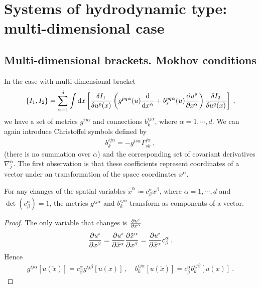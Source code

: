 \chapter{Systems of hydrodynamic type:  multi-dimensional case}

\section{Multi-dimensional brackets. Mokhov conditions}

In the case with multi-dimensional bracket
\begin{align}
    \left \lbrace I_1,I_2 \right \rbrace = \sum_{\alpha = 1}^ d \int \mathrm{d} x 
    \left[ \frac{\delta I_1}{\delta u^p(x)} \left( g^{pq \alpha}(u) \frac{\mathrm{d}}{\mathrm{d}x^\alpha} + b^{pq\alpha}_s(u) \frac{\partial u^s}{\partial x^\alpha} \right) \frac{\delta I_2}{\delta u^q(x)} \right] \:, \label{eq:multi-dimensional bracket}
\end{align}
we have a set of metrics $g^{ij \alpha}$ and connections $b^{ij \alpha}_k$, where $\alpha = 1 , \cdots, d$. We can again introduce Christoffel symbols defined by
\begin{align}
    b^{i j \alpha}_k = - g^{is \alpha} \Gamma^{j \alpha}_{sk}\:,
\end{align}
(there is no summation over $\alpha$) and the corresponding set of covariant derivatives $\nabla^{\alpha}_j$. The first observation is that these coefficients represent coordinates of a vector under an transformation of the space coordinates $x^\alpha$.
\begin{proposition}
    For any changes of the spatial variables $\tilde x^\alpha \coloneqq c^\alpha_\beta x^\beta$, where $\alpha = 1, \cdots, d$ and $\det (c^\alpha_\beta) = 1$, the metrics $g^{ij \alpha}$ and $b^{ij \alpha}_k$ transform as components of a vector.
\end{proposition}

\begin{proof}
    The only variable that changes is $\frac{\partial u^i}{\partial x^\alpha}$
    \begin{align}
        \frac{\partial u^i}{\partial x^\beta} = \frac{\partial u^i}{\partial \tilde x^\alpha} \frac{\partial \tilde x^\alpha}{\partial x^\beta} = \frac{\partial u^i}{\partial \tilde x^\alpha} c^\alpha_\beta \:.
    \end{align}
    Hence
    \begin{align}
        g^{ij \alpha}[u(\tilde x)] = c^\alpha_\beta g^{ij \beta}[u(x)] \:, \quad b^{ij \alpha}_k [u(\tilde x)] = c^\alpha_\beta b^{ij \beta}_k [u(x)] \:.
    \end{align}
\end{proof}


